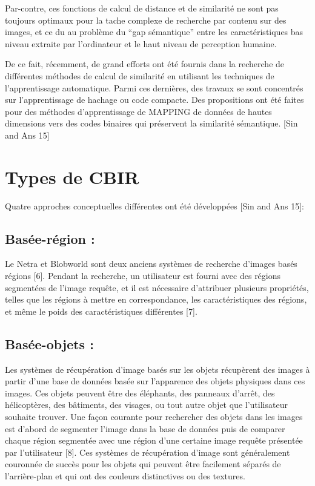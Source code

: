 	Par-contre, ces fonctions de calcul de distance et de similarité ne sont pas toujours optimaux pour la tache complexe de recherche par contenu sur des images, et ce du au problème du “gap sémantique” entre les caractéristiques bas niveau extraite par l'ordinateur et le haut niveau de perception humaine.

	De ce fait, récemment, de grand efforts ont été fournis dans la recherche de différentes méthodes de calcul de similarité en utilisant les techniques de l'apprentissage automatique.  Parmi ces dernières, des travaux se sont concentrés sur l'apprentissage de hachage ou code compacte. Des propositions ont été faites pour des méthodes d'apprentissage de MAPPING de données de hautes dimensions vers des codes binaires qui préservent la similarité sémantique.  [Sin and Ans 15]

\section{Types de CBIR}

	Quatre approches conceptuelles différentes ont été développées [Sin and Ans 15]:

\subsection{Basée-région :} Le Netra et Blobworld sont deux anciens systèmes de recherche d'images basés régions [6]. Pendant la recherche, un utilisateur est fourni avec des régions segmentées de l'image requête, et il est nécessaire d'attribuer plusieurs propriétés, telles que les régions à mettre en correspondance, les caractéristiques des régions, et même le poids des caractéristiques différentes [7].

\subsection{Basée-objets :} Les systèmes de récupération d'image basés sur les objets récupèrent des images à partir d'une base de données basée sur l'apparence des objets physiques dans ces images. Ces objets peuvent être des éléphants, des panneaux d'arrêt, des hélicoptères, des bâtiments, des visages, ou tout autre objet que l'utilisateur souhaite trouver. Une façon courante pour rechercher des objets dans les images est d'abord de segmenter l'image dans la base de données puis de comparer chaque région segmentée avec une région d'une certaine image requête présentée par l'utilisateur [8]. Ces systèmes de récupération d'image sont généralement couronnée de succès pour les objets qui peuvent être facilement séparés de l'arrière-plan et qui ont des couleurs distinctives ou des textures.

